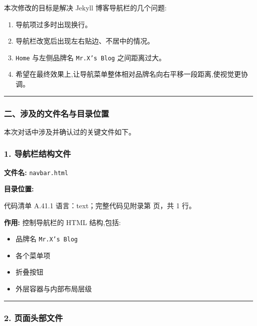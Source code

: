 \documentclass[lang=cn,scheme=chinese,color=blue,device=normal,toc=onecol,math=cm]{elegantbook}
\begin{document}
本次修改的目标是解决 Jekyll 博客导航栏的几个问题:\par


\begin{enumerate}
\item 导航项过多时出现换行。
\item 导航栏改宽后出现左右贴边、不居中的情况。
\item \texttt{Home} 与左侧品牌名 \texttt{Mr.X's Blog} 之间距离过大。
\item 希望在最终效果上,让导航菜单整体相对品牌名向右平移一段距离,使视觉更协调。
\end{enumerate}


\medskip\hrule\medskip


\subsubsection{二、涉及的文件名与目录位置}


本次对话中涉及并确认过的关键文件如下。\par


\subsubsection{1. 导航栏结构文件}


\textbf{文件名:} \texttt{navbar.html}\par


\textbf{目录位置:}\par


\begin{codeindexbox}{代码清单 A.41.1}
语言：text；完整代码见附录第 \pageref{code:41:1} 页，共 1 行。
\end{codeindexbox}


\textbf{作用:} 控制导航栏的 HTML 结构,包括:\par


\begin{itemize}
\item 品牌名 \texttt{Mr.X's Blog}
\item 各个菜单项
\item 折叠按钮
\item 外层容器与内部布局层级
\end{itemize}


\medskip\hrule\medskip


\subsubsection{2. 页面头部文件}
\end{document}
